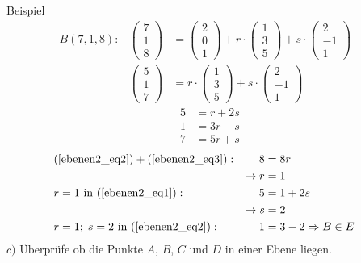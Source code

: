 \documentclass{article}
\begin{document}
\begin{boxx}[DarkBlue]{Beispiel}
    \begin{align*}
        &&&B(7,1,8):    & \begin{pmatrix}7\\1\\8\end{pmatrix} &= \begin{pmatrix}2\\0\\1\end{pmatrix} + r \cdot \begin{pmatrix}1\\3\\5\end{pmatrix} + s \cdot \begin{pmatrix}2\\-1\\1\end{pmatrix} &&&&\\
        &&&&\begin{pmatrix}5\\1\\7\end{pmatrix} &= r \cdot \begin{pmatrix}1\\3\\5\end{pmatrix} + s \cdot \begin{pmatrix}2\\-1\\1\end{pmatrix}
    \end{align*}
    \begin{align}
        5 &= r + 2s \label{ebenen2_eq1}\\
        1 &= 3r - s \label{ebenen2_eq2}\\
        7 &= 5r + s \label{ebenen2_eq3}
    \end{align}
    \begin{align*}
        &&&&&&&\text{(\ref{ebenen2_eq2})} + \text{(\ref{ebenen2_eq3})}:& 8 &= 8r &&&&&&&&\\
        &&&&&&&& \rightarrow r &= 1 \\
        &&&&&&& r = 1 \text{ in (\ref{ebenen2_eq1})}:& 5 &= 1 + 2s \\
        &&&&&&&& \rightarrow s &= 2 \\
        &&&&&&& r = 1;\; s = 2\text{ in (\ref{ebenen2_eq2})}:& 1 &= 3 - 2 \Rightarrow B\in E
    \end{align*}
    \newpage
    $c)$\hspace{3mm} Überprüfe ob die Punkte $A$, $B$, $C$ und $D$ in einer Ebene liegen.

\end{boxx}
\end{document}
